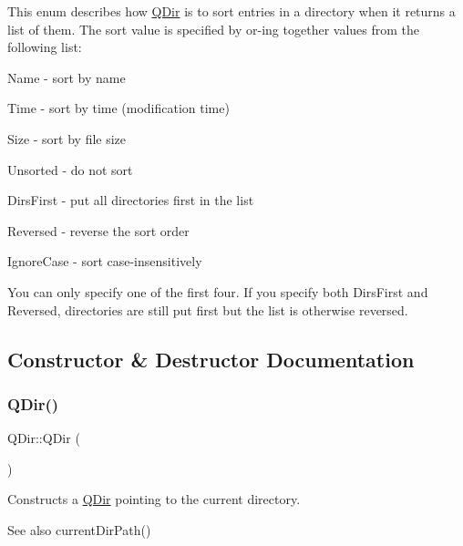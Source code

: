 This enum describes how \mbox{\hyperlink{class_q_dir}{Q\+Dir}} is to sort entries in a directory when it returns a list of them. The sort value is specified by or-\/ing together values from the following list\+: 
\begin{DoxyItemize}
\item {\ttfamily Name} -\/ sort by name 
\item {\ttfamily Time} -\/ sort by time (modification time) 
\item {\ttfamily Size} -\/ sort by file size 
\item {\ttfamily Unsorted} -\/ do not sort


\item {\ttfamily Dirs\+First} -\/ put all directories first in the list 
\item {\ttfamily Reversed} -\/ reverse the sort order 
\item {\ttfamily Ignore\+Case} -\/ sort case-\/insensitively


\end{DoxyItemize}

You can only specify one of the first four. If you specify both {\ttfamily Dirs\+First} and {\ttfamily Reversed}, directories are still put first but the list is otherwise reversed. 

\subsection{Constructor \& Destructor Documentation}
\mbox{\label{class_q_dir_a78cf34af6b7e0ffa3d11ef0ba0ecd403}} 
\subsubsection{\texorpdfstring{QDir()}{QDir()}\hspace{0.1cm}{\footnotesize\ttfamily [1/3]}}
{\footnotesize\ttfamily Q\+Dir\+::\+Q\+Dir (\begin{DoxyParamCaption}{ }\end{DoxyParamCaption})}

Constructs a \mbox{\hyperlink{class_q_dir}{Q\+Dir}} pointing to the current directory. \begin{DoxySeeAlso}{See also}
current\+Dir\+Path() 
\end{DoxySeeAlso}
\mbox{\label{class_q_dir_ad4f09eb0858b034f2b2edff184e1f50d}} 
